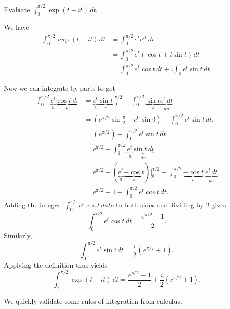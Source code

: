 \begin{example}
    \label{ex:complex-integral-real-variable-exp-t-it}
    Evaluate \(\displaystyle\int_0^{\pi/2} \exp(t + it) \, dt\).
    \begin{solution}
        We have
        \begin{align*}
            \int_0^{\pi/2} \exp(t + it) \, dt &= \int_0^{\pi/2} e^t e^{it} \, dt \\
            &= \int_0^{\pi/2} e^t (\cos t + i \sin t) \, dt \\
            &= \int_0^{\pi/2} e^t\cos t \, dt + i \int_0^1 e^t \sin t \, dt.
        \end{align*}

        Now we can integrate by parts to get
        \begin{align*}
            \int_0^{\pi/2} \underbrace{e^t}_{u} \underbrace{\cos t \, dt}_{dv} &= \underbrace{e^t}_{u} \underbrace{\sin t}_{v} \bigg|_0^{\pi/2} - \int_0^{\pi/2} \underbrace{\sin t}_{v} \underbrace{e^t \, dt}_{du} \\
            &= (e^{\pi/2} \sin \frac{\pi}{2} - e^0 \sin 0) - \int_0^{\pi/2} e^t \sin t \, dt.\\
            &= (e^{\pi/2} ) - \int_0^{\pi/2} e^t \sin t \, dt.\\
            &= e^{\pi/2} - \int_0^{\pi/2} \underbrace{e^t}_{u} \underbrace{\sin t \, dt}_{dv} \\
            &= e^{\pi/2} - (\underbrace{e^t}_{u} \underbrace{-\cos t}_{v}) \bigg|_0^{\pi/2} + \int_0^{\pi/2} \underbrace{-\cos t}_{v}~\underbrace{e^t \, dt}_{du} \\
            &= e^{\pi/2} - 1 - \int_0^{\pi/2} e^t \cos t \, dt.
        \end{align*}
        Adding the integral \(\int_0^{\pi/2} e^t \cos t\, date\) to both sides and dividing by \(2\) gives
        \[
            \int_0^{\pi/2} e^t \cos t \, dt = \frac{e^{\pi/2} - 1}{2}.
        \]
        Similarly,
        \[
            \int_0^{\pi/2} e^t \sin t \, dt = \frac{i}{2}(e^{\pi/2} + 1).
        \]
        Applying the definition thus yields
        \[
            \int_0^{\pi/2} \exp(t + it) \, dt = \frac{e^{\pi/2} - 1}{2} + \frac{i}{2}(e^{\pi/2} + 1).
        \]
    \end{solution}
\end{example}

We quickly validate some rules of integration from calculus.

